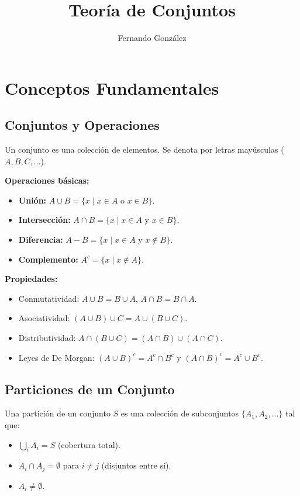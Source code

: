 \documentclass{article}
\begin{document}
	
	\title{Teoría de Conjuntos}
	\author{Fernando González}
	\date{}
	\maketitle
	
	\section{Conceptos Fundamentales}
	
	\subsection{Conjuntos y Operaciones}
	Un conjunto es una colección de elementos. Se denota por letras mayúsculas ($A, B, C, \dots$). 
	
	\textbf{Operaciones básicas:}
	\begin{itemize}
		\item \textbf{Unión:} $A \cup B = \{ x \mid x \in A \text{ o } x \in B \}$.
		\item \textbf{Intersección:} $A \cap B = \{ x \mid x \in A \text{ y } x \in B \}$.
		\item \textbf{Diferencia:} $A - B = \{ x \mid x \in A \text{ y } x \notin B \}$.
		\item \textbf{Complemento:} $A^c = \{ x \mid x \notin A \}$.
	\end{itemize}
	
	\textbf{Propiedades:}
	\begin{itemize}
		\item Conmutatividad: $A \cup B = B \cup A$, $A \cap B = B \cap A$.
		\item Asociatividad: $(A \cup B) \cup C = A \cup (B \cup C)$.
		\item Distributividad: $A \cap (B \cup C) = (A \cap B) \cup (A \cap C)$.
		\item Leyes de De Morgan: $(A \cup B)^c = A^c \cap B^c$ y $(A \cap B)^c = A^c \cup B^c$.
	\end{itemize}
	
	\subsection{Particiones de un Conjunto}
	Una partición de un conjunto $S$ es una colección de subconjuntos $\{ A_1, A_2, \dots \}$ tal que:
	\begin{itemize}
		\item $\bigcup_{i} A_i = S$ (cobertura total).
		\item $A_i \cap A_j = \emptyset$ para $i \neq j$ (disjuntos entre sí).
		\item $A_i \neq \emptyset$.
	\end{itemize}
	
\end{document}
